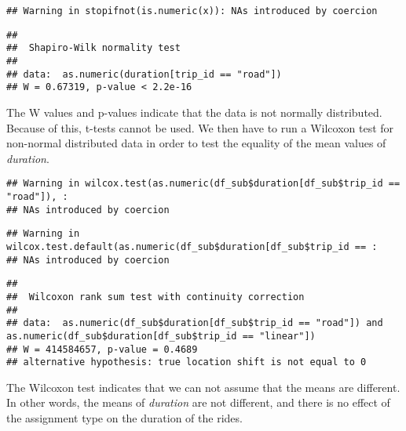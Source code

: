 \documentclass[
]{article}
\newenvironment{Shaded}{\begin{snugshade}}{\end{snugshade}}
\newcommand{\AttributeTok}[1]{\textcolor[rgb]{0.77,0.63,0.00}{#1}}
\newcommand{\FunctionTok}[1]{\textcolor[rgb]{0.00,0.00,0.00}{#1}}
\newcommand{\NormalTok}[1]{#1}
\newcommand{\SpecialCharTok}[1]{\textcolor[rgb]{0.00,0.00,0.00}{#1}}
\newcommand{\StringTok}[1]{\textcolor[rgb]{0.31,0.60,0.02}{#1}}
\begin{document}
\begin{verbatim}
## Warning in stopifnot(is.numeric(x)): NAs introduced by coercion
\end{verbatim}

\begin{verbatim}
## 
##  Shapiro-Wilk normality test
## 
## data:  as.numeric(duration[trip_id == "road"])
## W = 0.67319, p-value < 2.2e-16
\end{verbatim}

The W values and p-values indicate that the data is not normally
distributed. Because of this, t-tests cannot be used. We then have to
run a Wilcoxon test for non-normal distributed data in order to test the
equality of the mean values of \emph{duration}.

\begin{Shaded}
\end{Shaded}

\begin{verbatim}
## Warning in wilcox.test(as.numeric(df_sub$duration[df_sub$trip_id == "road"]), :
## NAs introduced by coercion
\end{verbatim}

\begin{verbatim}
## Warning in wilcox.test.default(as.numeric(df_sub$duration[df_sub$trip_id == :
## NAs introduced by coercion
\end{verbatim}

\begin{verbatim}
## 
##  Wilcoxon rank sum test with continuity correction
## 
## data:  as.numeric(df_sub$duration[df_sub$trip_id == "road"]) and as.numeric(df_sub$duration[df_sub$trip_id == "linear"])
## W = 414584657, p-value = 0.4689
## alternative hypothesis: true location shift is not equal to 0
\end{verbatim}

The Wilcoxon test indicates that we can not assume that the means are
different. In other words, the means of \emph{duration} are not
different, and there is no effect of the assignment type on the duration
of the rides.
\end{document}
